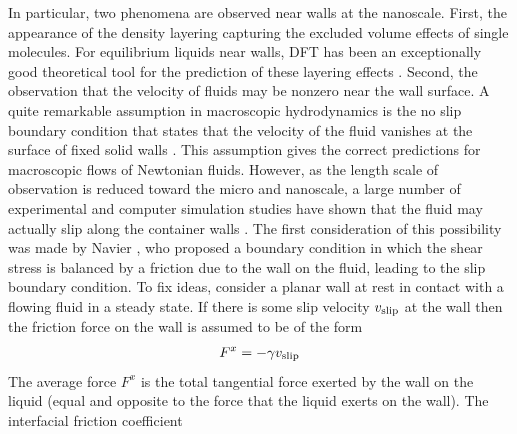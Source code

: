 \documentclass[b5paper,openright,10pt]{book}
\newcommand{\Note}[1]{{\bf \color{red}#1}}    %
\begin{document}
In  particular,  two phenomena  are
observed near  walls at the  nanoscale.  First, the appearance  of the
density  layering  capturing the  excluded  volume  effects of  single
molecules.   For equilibrium  liquids near  walls, 
DFT has  been an exceptionally good theoretical  tool for the
prediction of  these layering effects \cite{Hansen2013}.   Second, the
observation that the velocity of fluids  may be nonzero near the wall
surface.
A quite remarkable  assumption in macroscopic hydrodynamics  is the no
slip boundary  condition that  states that the  velocity of  the fluid
vanishes  at the  surface of  fixed solid  walls \cite{Batcherlor1967}.
This assumption gives the correct predictions for macroscopic flows of
Newtonian  fluids.  However,  as the  length scale  of observation  is
reduced  toward   the  micro  and   nanoscale,  a  large   number  of
experimental   \cite{Lauga2005}   and  computer   simulation   studies
\cite{Koplik1995} have shown that the fluid may actually slip along the
container walls  \cite{KarniadakisBook2005}.  The  first consideration
of this possibility was made  by Navier \cite{Navier1827}, who proposed
a  boundary condition  in  which the  shear stress  is  balanced by  a
friction due  to the wall on  the fluid, leading to  the slip boundary
condition.  To  fix ideas, consider a  planar wall at rest  in contact
with  a flowing  fluid  in a  steady  state.  If  there  is some  slip
velocity $  v_{\rm slip}$ at the  wall then the friction  force on the
wall is assumed to be of the form
\begin{align}
  F^x=-\gamma v_{\rm slip}
\end{align}
The average force  $F^x$ is the total tangential force  exerted by the
wall on  the liquid (equal and  opposite to the force  that the liquid
exerts   on  the   wall).    The   interfacial  friction   coefficient
\end{document}
